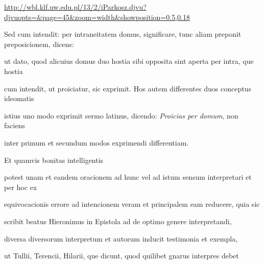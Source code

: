\url{http://wbl.klf.uw.edu.pl/13/2/iParkosz.djvu?djvuopts=&page=45&zoom=width&showposition=0.5,0.18}

\begin{VerbatimLatin}[numbers=none,formatcom=\color{blue}]
Sed cum intendit: per intraneitatem
domus, significare, tunc aliam preponit preposicionem, dicens: 
\end{VerbatimLatin}
%
\renewcommand{\theFancyVerbLine}{05-0\arabic{FancyVerbLine}\phantom{a}}
%
\begin{VerbatimLatin}
ut dato, quod alicuius domus duo hostia sibi opposita sint aperta per intra, que hostia{\color{red}\footnotemark[18]}

cum intendit, ut proiciatur, sic exprimit. Hos autem differentes duos conceptus ideomatis

istius uno modo exprimit sermo latinus, dicendo: \textit{Proicias per domum}, non faciens
\end{VerbatimLatin}
%
\renewcommand{\theFancyVerbLine}{\textcolor{green}{05-04\alph{FancyVerbLine}}}
\begin{VerbatimLatin}[firstnumber=1]
inter primum et secundum modos exprimendi differentiam.

\indentK Et quamvis bonitas intelligentis 
\end{VerbatimLatin}
\renewcommand{\theFancyVerbLine}{05-0\arabic{FancyVerbLine}\phantom{a}}

\begin{VerbatimLatin}[firstnumber=5]
potest unam et eandem oracionem ad hunc vel ad istum sensum interpretari et per hoc ex

equivocacionis errore ad intencionem veram et principalem eam reducere, quia sic

scribit beatus Hieronimus in Epistola ad  de optimo genere interpretandi,

diversa diversorum interpretum et autorum inducit testimonia et exempla,

ut Tullii, Terencii, Hilarii, que dicunt, quod quilibet gnarus interpres debet
\end{VerbatimLatin}

